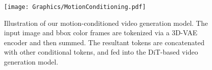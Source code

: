 
\begin{figure}[t]
    \centering
    \texttt{[image: Graphics/MotionConditioning.pdf]}
    \caption{Illustration of our motion-conditioned video generation model. The input image and bbox color frames are tokenized via a 3D-VAE encoder and then summed. The resultant tokens are concatenated with other conditional tokens, and fed into the DiT-based video generation model.}  
    \label{fig:motion-conditioning}
\end{figure}
